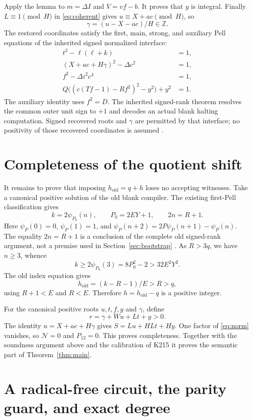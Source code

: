 \documentclass[11pt]{article}
\theoremstyle{remark}\newtheorem{remark}[theorem]{Remark}
\begin{document}
Apply the lemma to $m=\Delta I$ and $V=vf-b$. It proves that $y$
is integral. Finally $L\equiv1\pmod H$ in \eqref{eq:coherent} gives
$u\equiv X+ac\pmod H$, so
\[
 \gamma=(u-X-ac)/H\in\mathbb Z.
\]
The restored coordinates satisfy the first, main, strong, and auxiliary
Pell equations of the inherited signed normalized interface:
\begin{align*}
 t^2-\ell(\ell+k)&=1,\\
 (X+ac+H\gamma)^2-\Delta c^2&=1,\\
 f^2-\Delta i^2c^4&=1,\\
 Q\bigl((c(Tf-1)-Rf^2)^2-y^2\bigr)+y^2&=1.
\end{align*}
The auxiliary identity uses $f^2=D$. The inherited signed-rank theorem
resolves the common outer unit sign to $+1$ and decodes an actual blank
halting computation. Signed recovered roots and $\gamma$ are permitted
by that interface; no positivity of those recovered coordinates is assumed
\cite{norm12,blank67}.

\section{Completeness of the quotient shift}
\label{sec:complete}

It remains to prove that imposing $h_{\mathrm{old}}=q+h$ loses no
accepting witnesses. Take a canonical positive solution of the old blank
compiler. The existing first-Pell classification gives
\[
 k=2\psi_{P_0}(n),\qquad P_0=2EY+1,
 \qquad 2n=R+1.
\]
Here $\psi_P(0)=0$, $\psi_P(1)=1$, and
$\psi_P(n+2)=2P\psi_P(n+1)-\psi_P(n)$. The equality $2n=R+1$
is a conclusion of the complete old signed-rank argument, not a premise
used in Section~\ref{sec:bootstrap} \cite[Section 4]{blank67}.
As $R>3q$, we have $n\geq3$, whence
\[
 k\geq2\psi_{P_0}(3)=8P_0^2-2>32E^2Y^2.
\]
The old index equation gives
\[
 h_{\mathrm{old}}=(k-R-1)/E>R>q,
\]
using $R+1<E$ and $R<E$. Therefore
$h=h_{\mathrm{old}}-q$ is a positive integer.

For the canonical positive roots $u,t,f,y$ and $\gamma$, define
\[
 r=\gamma+Wu+Lt+y>0.
\]
The identity $u=X+ac+H\gamma$ gives
$S=Lu+HLt+Hy$. One factor of \eqref{eq:norm} vanishes, so
$\mathcal N=0$ and $P_{12}=0$. This proves completeness. Together with
the soundness argument above and the calibration of K215 it proves the
semantic part of Theorem~\ref{thm:main}.

\section{A radical-free circuit, the parity guard, and exact degree}
\label{sec:circuit}
\end{document}
